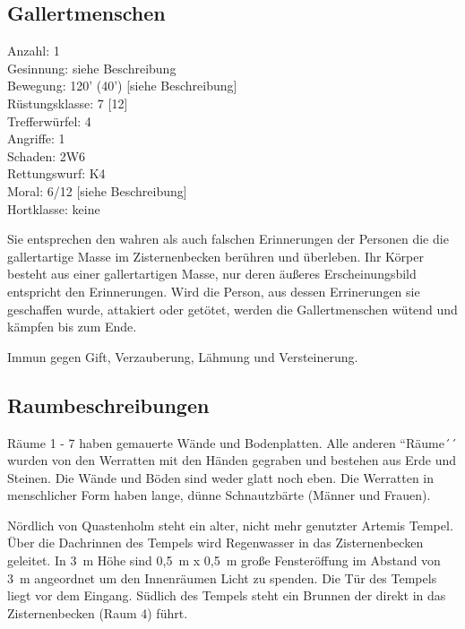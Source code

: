 \subsection{Gallertmenschen}

\begin{tabbing}
Anzahl: 1\\
Gesinnung: siehe Beschreibung\\
Bewegung: 120' (40') [siehe Beschreibung]\\
Rüstungsklasse: 7 [12]\\
Trefferwürfel: 4\\
Angriffe: 1\\
Schaden: 2W6\\
Rettungswurf: K4\\
Moral: 6/12 [siehe Beschreibung]\\
Hortklasse: keine\\
\end{tabbing}

Sie entsprechen den wahren als auch falschen Erinnerungen der Personen die
die gallertartige Masse im Zisternenbecken berühren und überleben. Ihr
Körper besteht aus einer gallertartigen Masse, nur deren äußeres
Erscheinungsbild entspricht den Erinnerungen. Wird die Person, aus
dessen Errinerungen sie geschaffen wurde, attakiert oder getötet,
werden die Gallertmenschen wütend und kämpfen bis zum Ende.

Immun gegen Gift, Verzauberung, Lähmung und Versteinerung.

\subsection{Raumbeschreibungen}

Räume 1 - 7 haben gemauerte Wände und Bodenplatten. Alle anderen
``Räume´´ wurden von den Werratten mit den Händen gegraben und bestehen
aus Erde und Steinen. Die Wände und Böden sind weder glatt noch eben.
Die Werratten in menschlicher Form haben lange, dünne Schnautzbärte
(Männer und Frauen).

Nördlich von Quastenholm steht ein alter, nicht mehr genutzter
Artemis Tempel. Über die Dachrinnen des Tempels wird Regenwasser
in das Zisternenbecken geleitet. In 3~m Höhe sind 0,5~m x 0,5~m große
Fensteröffung im Abstand von 3~m angeordnet um den Innenräumen Licht zu
spenden. Die Tür des Tempels liegt vor dem Eingang. Südlich des Tempels
steht ein Brunnen der direkt in das Zisternenbecken (Raum 4) führt.


